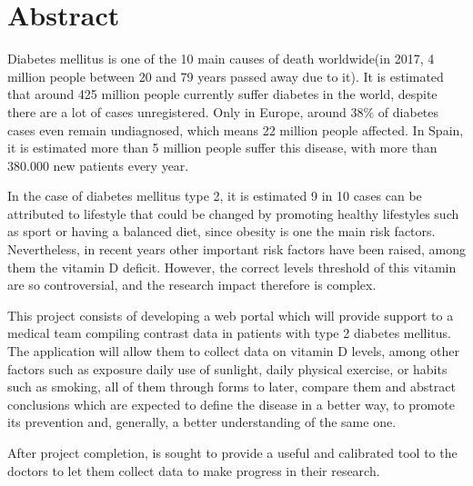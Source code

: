 \chapter*{Abstract}

Diabetes mellitus is one of the 10 main causes of death worldwide(in 2017, 4 million people between 20 and 79 years passed away due to it). It is estimated that around 425 million people currently suffer diabetes in the world, despite there are a lot of cases unregistered. Only in Europe, around 38\% of diabetes cases  even remain undiagnosed, which means 22 million people affected. In Spain, it is estimated more than 5 million people suffer this disease, with more than 380.000 new patients every year.
 \newline
 	
In the case of diabetes mellitus type 2, it is estimated 9 in 10 cases can be attributed to lifestyle that could be changed by promoting  healthy lifestyles such as sport or having a balanced diet, since obesity is one the main risk factors. Nevertheless, in recent years other important risk factors have been raised, among them the vitamin D deficit. However, the  correct levels threshold  of this vitamin are so controversial, and the research impact therefore is complex. \newline
 	
This project consists of developing a web portal which will provide support to a medical team compiling contrast data in patients with type 2 diabetes mellitus. The application will allow them to collect data on vitamin D levels, among other factors such as exposure daily use of sunlight, daily physical exercise, or habits such as smoking, all of them through forms to later, compare them and abstract conclusions which are expected to define the disease in a better way, to promote its prevention and, generally, a better understanding of the same one. \newline
 	  
After project completion, is sought to provide a useful and calibrated tool to the doctors to let them collect data to make progress in their research.
 	
 	
